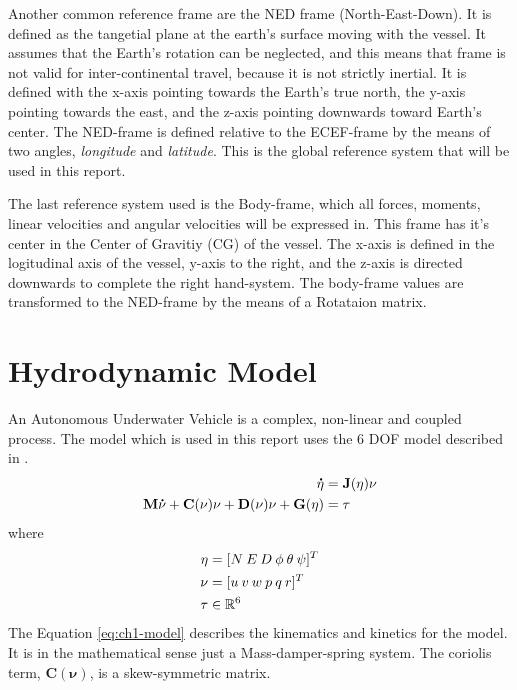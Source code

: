 	Another common reference frame are the NED frame (North-East-Down). It is defined as the tangetial plane at 
	the earth's surface moving with the vessel. It assumes that the Earth's rotation can be neglected, and this means 
	that frame is not valid for inter-continental travel, because it is not strictly inertial. It is defined with 
	the x-axis pointing towards the Earth's true north, the y-axis pointing towards the east, and the z-axis 
	pointing downwards toward Earth's center. The NED-frame is defined relative to the ECEF-frame by the means of 
	two angles, \textit{longitude} and \textit{latitude}. This is the global reference system that will be used 
	in this report. \cite{fossen}
	
	The last reference system used is the Body-frame, which all forces, moments, linear velocities and angular 
	velocities will be expressed in. This frame has it's center in the Center of Gravitiy (CG) of the vessel. The 
	x-axis is defined in the logitudinal axis of the vessel, y-axis to the right, and the z-axis is directed 
	downwards to complete the right hand-system. The body-frame values are transformed to the NED-frame by the means 
	of a Rotataion matrix.
	
	
	

\section{Hydrodynamic Model}
	\label{sec:ch1-model}
	An Autonomous Underwater Vehicle is a complex, non-linear and coupled process. The model which is used in this
	report uses the 6 DOF model described in \cite{fossen}.
	\begin{equation}
	\label{eq:ch1-model}
		\begin{aligned}
			\mathbf{\dot{\eta}} &= \mathbf{J}(\mathbf{\eta}) \mathbf{\nu} \\
			\mathbf{M}\mathbf{\dot{\nu}} + \mathbf{C}(\mathbf{\nu})\mathbf{\nu} + \mathbf{D}(\mathbf{\nu})\mathbf{\nu} + \mathbf{G}(\mathbf{\eta}) &= \mathbf{\tau} \\
		\end{aligned}
	\end{equation}
	where 
	\begin{align*}
		\mathbf{\eta} &= [N \: E \: D \: \phi \: \theta \: \psi ]^T \\
		\mathbf{\nu}  &= [u \: v \: w \: p \: q \: r]^T \\
		\mathbf{\tau} & \in \mathbb{R}^6
	\end{align*}
	The Equation \eqref{eq:ch1-model} describes the kinematics and kinetics for the model. It is in the 
	mathematical sense just a Mass-damper-spring system. The coriolis term, $\mathbf{C}(\mathbf{\nu})$, is 
	a skew-symmetric matrix.
	
